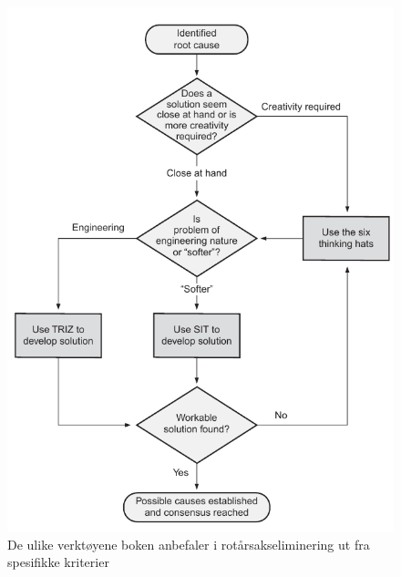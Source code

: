 \begin{figure}[H]
    \centering
    \includegraphics[scale=0.65]{main/bilder/verktoyvalg/verktoyvalg_rotarsakseliminering.pdf}
    \caption[Verktøyvalg for rotårsakseliminering]{De ulike verktøyene boken anbefaler i rotårsakseliminering ut fra spesifikke kriterier}
    \label{fig:verktoyvalg-rotarsakseliminering}
\end{figure}

